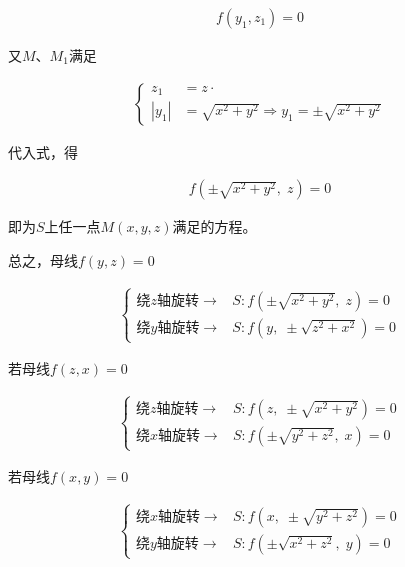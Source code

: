 \documentclass[
	11pt, %
	a4paper, %
]{WhuSakuraBook}
\begin{document}
    \begin{align}
        f\left(y_1, z_1\right) = 0
        \label{rotational-surface-2}
    \end{align}

    又\(M\)、\(M_1\)满足

    \begin{align*}
        \left\{\begin{aligned}
        z_1 & =z \cdot \\
        \left|y_1\right| & =\sqrt{x^2+y^2} \Rightarrow y_1= \pm \sqrt{x^2+y^2}
        \end{aligned}\right.
    \end{align*}

    代入式，得

    \begin{align*}
        f\left(\pm \sqrt{x^2 + y^2},\; z\right) = 0
    \end{align*}

    即为\(S\)上任一点\(M\left(x,y,z\right)\)满足的方程。

    总之，母线\(f\left(y, z\right) = 0\)

    \begin{align*}
        \left\{\begin{aligned}
        \text{绕\(z\)轴旋转}\rightarrow & S: f\left(\pm \sqrt{x^2 + y^2},\; z\right) = 0 \\
        \text{绕\(y\)轴旋转}\rightarrow & S: f\left(y,\; \pm \sqrt{z^2 + x^2}\right) = 0
        \end{aligned}\right.
    \end{align*}

    若母线\(f\left(z, x\right) = 0\)

    \begin{align*}
        \left\{\begin{aligned}
        \text{绕\(z\)轴旋转}\rightarrow & S: f\left(z,\; \pm \sqrt{x^2 + y^2}\right) = 0 \\
        \text{绕\(x\)轴旋转}\rightarrow & S: f\left(\pm \sqrt{y^2 + z^2},\; x\right) = 0
        \end{aligned}\right.
    \end{align*}

    若母线\(f\left(x, y\right) = 0\)

    \begin{align*}
        \left\{\begin{aligned}
        \text{绕\(x\)轴旋转}\rightarrow & S: f\left(x,\; \pm \sqrt{y^2 + z^2}\right) = 0 \\
        \text{绕\(y\)轴旋转}\rightarrow & S: f\left(\pm \sqrt{x^2 + z^2},\; y\right) = 0
        \end{aligned}\right.
    \end{align*}
\end{document}
